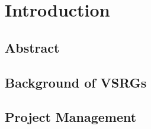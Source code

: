 \chapter{Introduction}\label{ch:introduction}


\section{Abstract}\label{sec:abstract}



\section{Background of VSRGs}\label{sec:background-of-vsrgs}



\section{Project Management}\label{sec:project-management}
